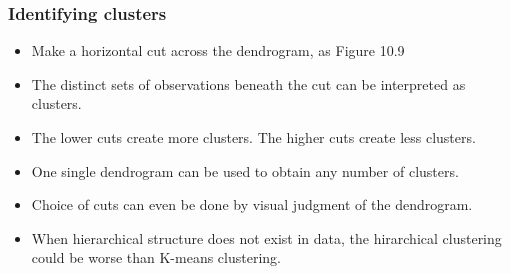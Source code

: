 \documentclass{beamer}
\begin{document}
                           
                       	       \begin{frame}
                       	       	\frametitle{ Identifying clusters}
                       	       	\begin{itemize}
                       	       		\item Make a horizontal cut across the
                       	       		dendrogram, as   Figure 10.9
                       	       		
                       	       		\item  The distinct sets of observations beneath the cut can be interpreted as clusters.
                       	       		
                       	       	    \item The lower cuts create more clusters. The higher cuts create less clusters.
                       	       	    
                       	       	    \item One single dendrogram can be used to obtain any number of
                       	       	    clusters.
                       	       	    
                       	       		\item  Choice of cuts can even be done by visual judgment of the dendrogram.
                       	       	 
                       	       		\item When hierarchical structure does not exist in data, the hirarchical clustering could be worse than K-means clustering.
                       	       		
                       	       	\end{itemize}
                       	       \end{frame}   
               
          
              
                
   
  
               
\end{document}
